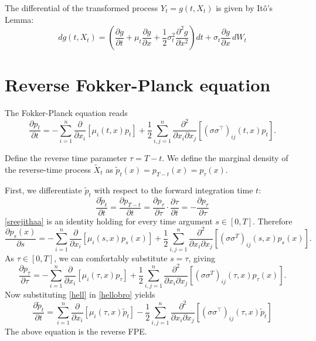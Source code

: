 \documentclass[11pt]{amsart}
\theoremstyle{plain}
\theoremstyle{definition}
\theoremstyle{remark}
\numberwithin{equation}{section}
\begin{document}
{The differential of the transformed process $Y_t = g(t, X_t)$ is given by Itô's Lemma:
\begin{equation}
    dg(t, X_t) = \left( \frac{\partial g}{\partial t} + \mu_t \frac{\partial g}{\partial x} + \frac{1}{2} \sigma_t^2 \frac{\partial^2 g}{\partial x^2} \right) dt + \sigma_t \frac{\partial g}{\partial x} \, dW_t
\end{equation}


\section{Reverse Fokker-Planck equation}
\label{app:D}

The Fokker-Planck equation reads
\begin{equation}
    \frac{\partial p_t}{\partial t} = -\sum_{i=1}^n \frac{\partial}{\partial x_i} [\mu_i(t, x) p_t] + \frac{1}{2} \sum_{i,j=1}^n \frac{\partial^2}{\partial x_i \partial x_j} [(\sigma\sigma^\top)_{ij}(t, x) p_t].
    \label{sreejithaa}
\end{equation}

Define the reverse time parameter $\tau = T - t$. We define the marginal density of the reverse-time process $\tilde{X}_t$ as $\tilde{p}_t(x) = p_{T-t}(x) = p_\tau(x)$.

First, we differentiate $\tilde{p}_t$ with respect to the forward integration time $t$:
\begin{equation}
    \frac{\partial \tilde{p}_t}{\partial t} = \frac{\partial {p}_{T-t}}{\partial t} = \frac{\partial p_{\tau}}{\partial \tau}\cdot \frac{\partial \tau}{\partial t}   = -\frac{\partial p_\tau}{\partial \tau}
    \label{hell}
\end{equation}
\eqref{sreejithaa} is an identity holding for every time argument $s \in [0,T]$. Therefore
\[
\frac{\partial p_s(x)}{\partial s} = -\sum_{i=1}^n \frac{\partial}{\partial x_i}[\mu_i(s,x)p_s(x)]
+ \frac{1}{2}\sum_{i,j=1}^n \frac{\partial^2}{\partial x_i \partial x_j}[(\sigma\sigma^T)_{ij}(s,x)p_s(x)].
\]
As $\tau \in [0,T]$, we can comfortably substitute $s = \tau$, giving
\begin{equation}
\frac{\partial p_\tau}{\partial \tau} = -\sum_{i=1}^n \frac{\partial}{\partial x_i}[\mu_i(\tau,x)p_\tau]
+ \frac{1}{2}\sum_{i,j=1}^n \frac{\partial^2}{\partial x_i \partial x_j}[(\sigma\sigma^T)_{ij}(\tau,x)p_\tau(x)].
\label{hellobro}
\end{equation}
Now substituting \eqref{hell} in \eqref{hellobro} yields
\begin{equation}
    \boxed{\frac{\partial \tilde{p}_t}{\partial t} = \sum_{i=1}^n \frac{\partial}{\partial x_i} [\mu_i(\tau, x) \tilde{p}_t] - \frac{1}{2} \sum_{i,j=1}^n \frac{\partial^2}{\partial x_i \partial x_j} [(\sigma\sigma^\top)_{ij}(\tau, x) \tilde{p}_t]}
\end{equation}
The above equation is the reverse FPE.\\

}
\end{document}
